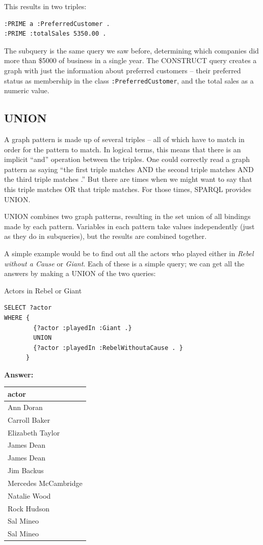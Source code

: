 This results in two triples:

\begin{lstlisting}
:PRIME a :PreferredCustomer . 
:PRIME :totalSales 5350.00 .
\end{lstlisting}


The subquery is the same query we saw before, determining which
companies did more than \$5000 of business in a single year. The
CONSTRUCT query creates a graph with just the information about
preferred customers -- their preferred status as membership in the class
\texttt{:PreferredCustomer}, and the total sales as a numeric value.

\subsection{UNION}

A graph pattern is made up of several triples -- all of which have to
match in order for the pattern to match. In logical terms, this means
that there is an implicit ``and'' operation between the triples. One
could correctly read a graph pattern as saying ``the first triple
matches AND the second triple matches AND the third triple matches .''
But there are times when we might want to say that this triple matches
OR that triple matches. For those times, SPARQL provides UNION.

UNION combines two graph patterns, resulting in the set union of all
bindings made by each pattern. Variables in each pattern take values
independently (just as they do in subqueries), but the results are
combined together.

A simple example would be to find out all the actors who played either
in \emph{Rebel without a Cause} or
\emph{Giant}. Each of these is a simple query; we can get all the
answers by making a UNION of the two queries:

\begin{query}Actors in Rebel or Giant\end{query}

\begin{lstlisting}
SELECT ?actor
WHERE {
        {?actor :playedIn :Giant .}
        UNION
        {?actor :playedIn :RebelWithoutaCause . }
      }
\end{lstlisting}


\textbf{\textbf{Answer:}}

\begin{tabular}{|l|}
\hline
actor\\
\hline
Ann Doran\\
Carroll Baker\\
Elizabeth Taylor\\
James Dean\\
James Dean\\
Jim Backus\\
Mercedes McCambridge\\
Natalie Wood\\
Rock Hudson\\
Sal Mineo\\
Sal Mineo\\
\hline
\end{tabular}

